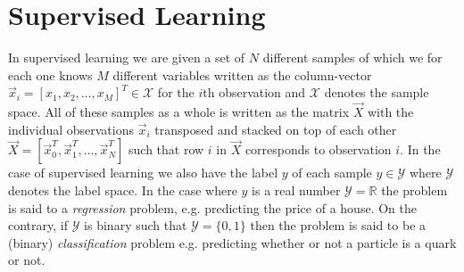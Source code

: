 \section{Supervised Learning}
\label{sec:ml:supervised_learning}
In supervised learning we are given a set of $N$ different samples of which we for each one knows $M$ different variables written as the column-vector $\vec{x}_i = [x_1, x_2, \dots, x_M]^T \in \mathcal{X}$ for the $i$th observation and $\mathcal{X}$ denotes the sample space. All of these samples as a whole is written as the matrix $\vec{X}$ with the individual observations $\vec{x}_i$ transposed and stacked on top of each other $\vec{X} = [\vec{x}_0^T, \vec{x}_1^T, \dots, \vec{x}_N^T]$ such that row $i$ in $\vec{X}$ corresponds to observation $i$. In the case of supervised learning we also have the label $y$ of each sample $y \in \mathcal{Y}$ where $\mathcal{Y}$ denotes the label space. 
In the case where $y$ is a real number $\mathcal{Y} = \mathbb{R}$ the problem is said to a \emph{regression} problem, e.g. predicting the price of a house. On the contrary, if $\mathcal{Y}$ is binary such that $\mathcal{Y} = \{0, 1\}$ then the problem is said to be a (binary) \emph{classification} problem e.g. predicting whether or not a particle is a quark or not. 

